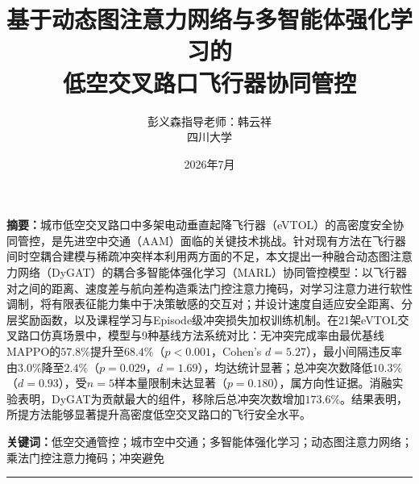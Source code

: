 \documentclass[12pt,a4paper,UTF8]{ctexart}
\begin{document}
\title{\textbf{基于动态图注意力网络与多智能体强化学习的\\低空交叉路口飞行器协同管控}}
\author{彭义森\quad 指导老师：韩云祥\\[4pt]\small 四川大学}
\date{2026年7月}

\maketitle

\vspace{6pt}
\noindent\textbf{摘\quad 要：}城市低空交叉路口中多架电动垂直起降飞行器（eVTOL）的高密度安全协同管控，是先进空中交通（AAM）面临的关键技术挑战。针对现有方法在飞行器间时空耦合建模与稀疏冲突样本利用两方面的不足，本文提出一种融合动态图注意力网络（DyGAT）的耦合多智能体强化学习（MARL）协同管控模型：以飞行器对之间的距离、速度差与航向差构造乘法门控注意力掩码，对学习注意力进行软性调制，将有限表征能力集中于决策敏感的交互对；并设计速度自适应安全距离、分层奖励函数，以及课程学习与Episode级冲突损失加权训练机制。在21架eVTOL交叉路口仿真场景中，模型与9种基线方法系统对比：无冲突完成率由最优基线MAPPO的$57.8\%$提升至$68.4\%$（$p<0.001$，Cohen's $d=5.27$），最小间隔违反率由$3.0\%$降至$2.4\%$（$p=0.029$，$d=1.69$），均达统计显著；总冲突次数降低$10.3\%$（$d=0.93$），受$n=5$样本量限制未达显著（$p=0.180$），属方向性证据。消融实验表明，DyGAT为贡献最大的组件，移除后总冲突次数增加$173.6\%$。结果表明，所提方法能够显著提升高密度低空交叉路口的飞行安全水平。

\vspace{6pt}
\noindent\textbf{关键词：}低空交通管控；城市空中交通；多智能体强化学习；动态图注意力网络；乘法门控注意力掩码；冲突避免

\vspace{8pt}
\hrule
\vspace{10pt}
\end{document}
